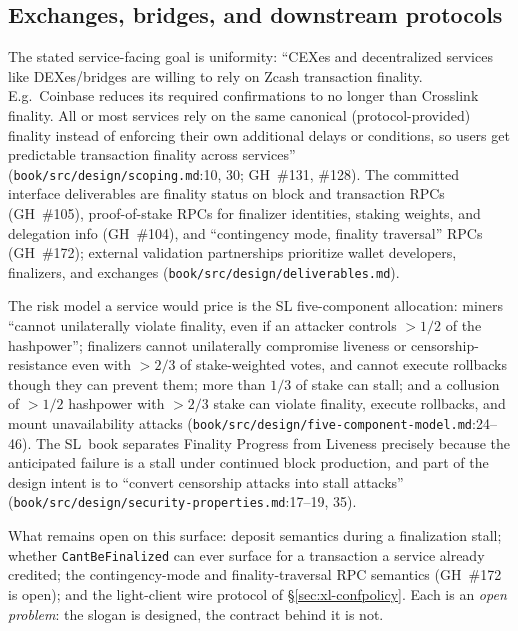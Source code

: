 \documentclass[11pt,a4paper]{article}
\theoremstyle{definition}
\begin{document}
\subsection{Exchanges, bridges, and downstream protocols}
\label{sec:xl-services}

The stated service-facing goal is uniformity: ``CEXes and decentralized
services like DEXes/bridges are willing to rely on Zcash transaction
finality. E.g.\ Coinbase reduces its required confirmations to no longer
than Crosslink finality. All or most services rely on the same canonical
(protocol-provided) finality instead of enforcing their own additional
delays or conditions, so users get predictable transaction finality
across services'' (\texttt{book/src/design/scoping.md}:10, 30; GH~\#131,
\#128). The committed interface deliverables are finality status on block
and transaction RPCs (GH~\#105), proof-of-stake RPCs for finalizer
identities, staking weights, and delegation info (GH~\#104), and
``contingency mode, finality traversal'' RPCs (GH~\#172); external
validation partnerships prioritize wallet developers, finalizers, and
exchanges (\texttt{book/src/design/deliverables.md}).

The risk model a service would price is the SL five-component
allocation: miners ``cannot unilaterally violate finality, even if an
attacker controls $>1/2$ of the hashpower''; finalizers cannot
unilaterally compromise liveness or censorship-resistance even with
$>2/3$ of stake-weighted votes, and cannot execute rollbacks though they
can prevent them; more than $1/3$ of stake can stall; and a collusion of
$>1/2$ hashpower with $>2/3$ stake can violate finality, execute
rollbacks, and mount unavailability attacks
(\texttt{book/src/design/five-component-model.md}:24--46). The SL~book
separates Finality Progress from Liveness precisely because the
anticipated failure is a stall under continued block production, and part
of the design intent is to ``convert censorship attacks into stall
attacks'' (\texttt{book/src/design/security-properties.md}:17--19, 35).

What remains open on this surface: deposit semantics during a
finalization stall; whether \texttt{CantBeFinalized} can ever surface for
a transaction a service already credited; the contingency-mode and
finality-traversal RPC semantics (GH~\#172 is open); and the light-client
wire protocol of \S\ref{sec:xl-confpolicy}. Each is an \emph{open
problem}: the slogan is designed, the contract behind it is not.
\end{document}
